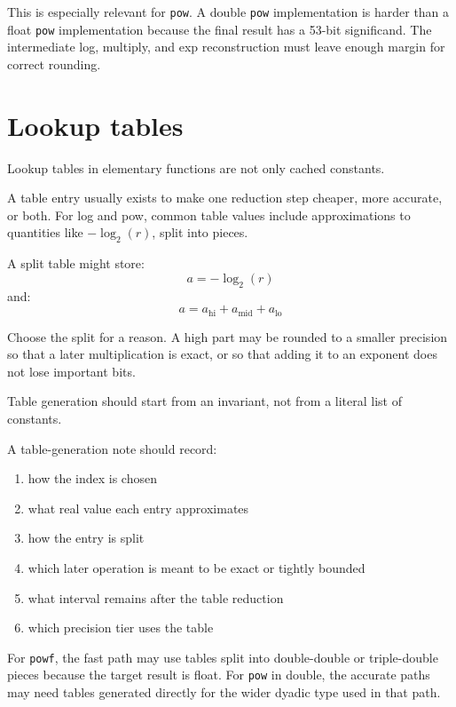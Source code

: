 \documentclass[manuscript, nonacm]{acmart}
\begin{document}
  This is especially relevant for \texttt{pow}. A double \texttt{pow}
  implementation is harder than a float \texttt{pow} implementation because the
  final result has a 53-bit significand. The intermediate log, multiply, and
  exp reconstruction must leave enough margin for correct rounding.



  \section{Lookup tables}

  Lookup tables in elementary functions are not only cached constants.

  A table entry usually exists to make one reduction step cheaper, more
  accurate, or both. For log and pow, common table values include
  approximations to quantities like $-\log_2(r)$, split into pieces.

  A split table might store:
  \[ a = -\log_2(r) \]
  and:
  \[ a = a_\mathrm{hi} + a_\mathrm{mid} + a_\mathrm{lo} \]

  Choose the split for a reason. A high part may be rounded to a smaller
  precision so that a later multiplication is exact, or so that adding it to an
  exponent does not lose important bits.

  Table generation should start from an invariant, not from a literal list of
  constants.

  A table-generation note should record:

  \begin{enumerate}
    \item how the index is chosen
    \item what real value each entry approximates
    \item how the entry is split
    \item which later operation is meant to be exact or tightly bounded
    \item what interval remains after the table reduction
    \item which precision tier uses the table
  \end{enumerate}

  For \texttt{powf}, the fast path may use tables split into double-double or
  triple-double pieces because the target result is float. For \texttt{pow} in
  double, the accurate paths may need tables generated directly for the wider
  dyadic type used in that path.
\end{document}
